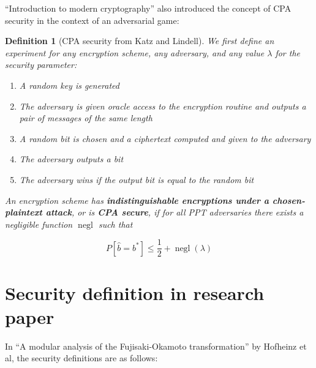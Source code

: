 \documentclass{article}
\newtheorem{definition}{Definition}[section]
\begin{document}
``Introduction to modern cryptography''\cite{katz2007introduction} also introduced the concept of CPA security in the context of an adversarial game:

\begin{definition}[CPA security from Katz and Lindell]
    We first define an experiment for any encryption scheme, any adversary, and any value $\lambda$ for the security parameter:

    \begin{enumerate}
        \item A random key is generated
        \item The adversary is given oracle access to the encryption routine and outputs a pair of messages of the same length
        \item A random bit is chosen and a ciphertext computed and given to the adversary
        \item The adversary outputs a bit
        \item The adversary wins if the output bit is equal to the random bit
    \end{enumerate}

    An encryption scheme has \textbf{indistinguishable encryptions under a chosen-plaintext attack}, or is \textbf{CPA secure}, if for all PPT adversaries there exists a negligible function $\operatorname{negl}$ such that

    \begin{equation*}
        P[\hat{b} = b^\ast] \leq \frac{1}{2} + \operatorname{negl}(\lambda)
    \end{equation*}
\end{definition}

\section{Security definition in research paper}
In ``A modular analysis of the Fujisaki-Okamoto transformation''\cite{hofheinz2017modular} by Hofheinz et al, the security definitions are as follows:
\end{document}
